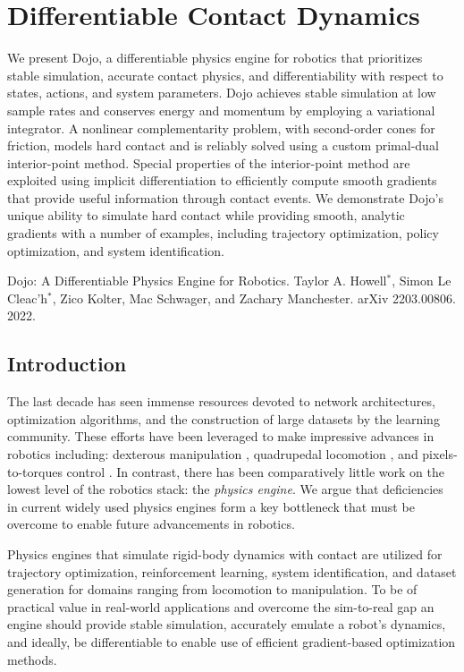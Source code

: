 \chapter{Differentiable Contact Dynamics}

We present Dojo, a differentiable physics engine for robotics that prioritizes stable simulation, accurate contact physics, and differentiability with respect to states, actions, and system parameters. Dojo achieves stable simulation at low sample rates and conserves energy and momentum by employing a variational integrator. A nonlinear complementarity problem, with second-order cones for friction, models hard contact and is reliably solved using a custom primal-dual interior-point method. Special properties of the interior-point method are exploited using implicit differentiation to efficiently compute smooth gradients that provide useful information through contact events. We demonstrate Dojo's unique ability to simulate hard contact while providing smooth, analytic gradients with a number of examples, including trajectory optimization, policy optimization, and system identification.

\vspace*{\fill}

\noindent Dojo: A Differentiable Physics Engine for Robotics. Taylor A. Howell$^*$, Simon Le Cleac'h$^*$, Zico Kolter, Mac Schwager, and Zachary Manchester. arXiv 2203.00806. 2022.

\pagebreak

\section{Introduction}
The last decade has seen immense resources devoted to network architectures, optimization algorithms, and the construction of large datasets by the learning community. These efforts have been leveraged to make impressive advances in robotics including: dexterous manipulation \cite{andrychowicz2020learning,akkaya2019solving}, quadrupedal locomotion \cite{lee2020learning, kumar2021rma}, and pixels-to-torques control \cite{levine2018learning}. In contrast, there has been comparatively little work on the lowest level of the robotics stack: the \textit{physics engine}. We argue that deficiencies in current widely used physics engines form a key bottleneck that must be overcome to enable future advancements in robotics. 

Physics engines that simulate rigid-body dynamics with contact are utilized for trajectory optimization, reinforcement learning, system identification, and dataset generation for domains ranging from locomotion to manipulation. To be of practical value in real-world applications and overcome the sim-to-real gap an engine should provide stable simulation, accurately emulate a robot's dynamics, and ideally, be differentiable to enable use of efficient gradient-based optimization methods.

